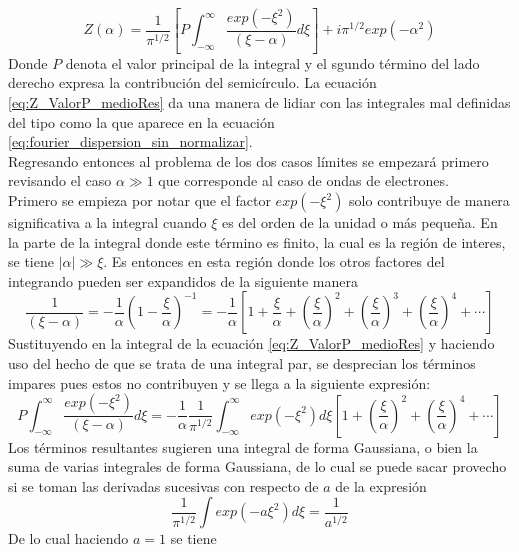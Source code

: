 \documentclass[../tesis_main_file.tex]{subfile}
\begin{document}
\begin{equation}
\label{eq:Z_ValorP_medioRes}
Z(\alpha) = \frac{1}{\pi ^{1/2}}\left[P\int ^{\infty}_{-\infty} \frac{exp(-\xi ^2)}{(\xi -\alpha)}d\xi\right]+ i\pi^{1/2}exp(-\alpha ^2)
\end{equation}
Donde $P$ denota el valor principal de la integral y el sgundo término del lado derecho expresa la contribución del semicírculo. La ecuación \ref{eq:Z_ValorP_medioRes} da una manera de lidiar con las integrales mal definidas del tipo como la que aparece en la ecuación \ref{eq:fourier_dispersion_sin_normalizar}.\\
Regresando entonces al problema de los dos casos límites se empezará primero revisando el caso $\alpha \gg 1$ que corresponde al caso de ondas de electrones.\\
Primero se empieza por notar que el factor $exp(-\xi^2)$ solo contribuye de manera significativa a la integral cuando $\xi$ es del orden de la unidad o más pequeña. En la parte de la integral donde este término es finito, la cual es la región de interes, se tiene $|\alpha | \gg \xi$. 
Es entonces en esta región donde los otros factores del integrando pueden ser expandidos de la siguiente manera
\begin{equation}
\frac{1}{(\xi - \alpha)}= -\frac{1}{\alpha}\left(1-\frac{\xi}{\alpha}\right)^{-1}=-\frac{1}{\alpha}\left[1+\frac{\xi}{\alpha}+\left(\frac{\xi}{\alpha}\right)^2+\left(\frac{\xi}{\alpha}\right)^3+\left(\frac{\xi}{\alpha}\right)^4+\cdots\right]
\end{equation}
Sustituyendo en la integral de la ecuación \ref{eq:Z_ValorP_medioRes} y haciendo uso del hecho de que se trata de una integral par, se desprecian los términos impares pues estos no contribuyen y se llega a la siguiente expresión:
\begin{equation}
P\int ^{\infty}_{-\infty} \frac{exp(-\xi ^2)}{(\xi -\alpha)}d\xi = - \frac{1}{\alpha}\frac{1}{\pi ^{1/2}}\int^{\infty}_{-\infty}exp(-\xi^2)d\xi \left[1 + \left(\frac{\xi}{\alpha}\right)^2 + \left(\frac{\xi}{\alpha}\right)^4 + \cdots \right]
\end{equation}
Los términos resultantes sugieren una integral de forma Gaussiana, o bien la suma de varias integrales de forma Gaussiana, de lo cual se puede sacar provecho si se toman las derivadas sucesivas con respecto de $a$ de la expresión
\begin{equation*}
\frac{1}{\pi ^{1/2}}\int exp(-a\xi ^2)d\xi =\frac{1}{a^{1/2}}
\end{equation*}
De lo cual haciendo $a=1$ se tiene
\end{document}
